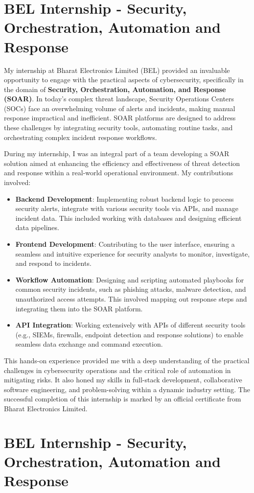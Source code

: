 \section{BEL Internship - Security, Orchestration, Automation and Response}
My internship at Bharat Electronics Limited (BEL) provided an invaluable opportunity to engage with the practical aspects of cybersecurity, specifically in the domain of \textbf{Security, Orchestration, Automation, and Response (SOAR)}. In today's complex threat landscape, Security Operations Centers (SOCs) face an overwhelming volume of alerts and incidents, making manual response impractical and inefficient. SOAR platforms are designed to address these challenges by integrating security tools, automating routine tasks, and orchestrating complex incident response workflows.

During my internship, I was an integral part of a team developing a SOAR solution aimed at enhancing the efficiency and effectiveness of threat detection and response within a real-world operational environment. My contributions involved:
\begin{itemize}
    \item \textbf{Backend Development}: Implementing robust backend logic to process security alerts, integrate with various security tools via APIs, and manage incident data. This included working with databases and designing efficient data pipelines.
    \item \textbf{Frontend Development}: Contributing to the user interface, ensuring a seamless and intuitive experience for security analysts to monitor, investigate, and respond to incidents.
    \item \textbf{Workflow Automation}: Designing and scripting automated playbooks for common security incidents, such as phishing attacks, malware detection, and unauthorized access attempts. This involved mapping out response steps and integrating them into the SOAR platform.
    \item \textbf{API Integration}: Working extensively with APIs of different security tools (e.g., SIEMs, firewalls, endpoint detection and response solutions) to enable seamless data exchange and command execution.
\end{itemize}
This hands-on experience provided me with a deep understanding of the practical challenges in cybersecurity operations and the critical role of automation in mitigating risks. It also honed my skills in full-stack development, collaborative software engineering, and problem-solving within a dynamic industry setting. The successful completion of this internship is marked by an official certificate from Bharat Electronics Limited.

\section{BEL Internship - Security, Orchestration, Automation and Response}
